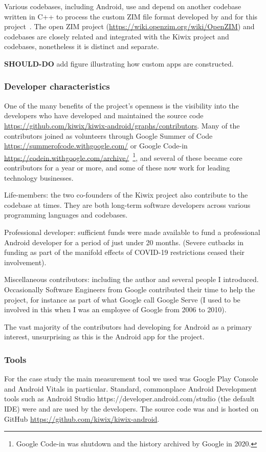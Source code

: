 Various codebases, including Android, use and depend on another codebase written in C++ to process the custom ZIM file format developed by and for this project~\citep{gaudin2017_wikimedia_kiwix_android}. The open ZIM project (\url{https://wiki.openzim.org/wiki/OpenZIM}) and codebases are closely related and integrated with the Kiwix project and codebases, nonetheless it is distinct and separate.

\textbf{SHOULD-DO} add figure illustrating how custom apps are constructed.

\subsubsection{Developer characteristics}
One of the many benefits of the project’s openness is the visibility into the developers who have developed and maintained the source code \url{https://github.com/kiwix/kiwix-android/graphs/contributors}. Many of the contributors joined as volunteers through Google Summer of Code \url{https://summerofcode.withgoogle.com/} or Google Code-in \url{https://codein.withgoogle.com/archive/}~\footnote{Google Code-in was shutdown and the history archived by Google in 2020.}, and several of these became core contributors for a year or more, and some of these now work for leading technology businesses. 

Life-members: the two co-founders of the Kiwix project also contribute to the codebase at times. They are both long-term software developers across various programming languages and codebases.

Professional developer: sufficient funds were made available to fund a professional Android developer for a period of just under 20 months. (Severe cutbacks in funding as part of the manifold effects of COVID-19 restrictions ceased their involvement).

Miscellaneous contributors: including the author and several people I introduced. Occasionally Software Engineers from Google contributed their time to help the project, for instance as part of what Google call Google Serve (I used to be involved in this when I was an employee of Google from 2006 to 2010).

The vast majority of the contributors had developing for Android as a primary interest, unsurprising as this is the Android app for the project.

\subsubsection{Tools}
For the case study the main measurement tool we used was Google Play Console and Android Vitals in particular. Standard, commonplace Android Development tools such as Android Studio https://developer.android.com/studio (the default IDE) were and are used by the developers. The source code was and is hosted on GitHub \url{https://github.com/kiwix/kiwix-android}.


